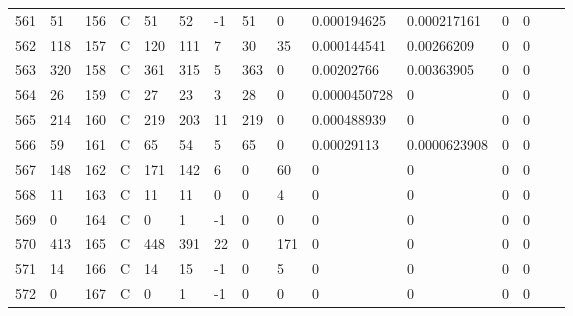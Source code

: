 \begin{longtable}{lllllllllllllll}
	561 & 51                & 156 & C   & 51                & 52                & -1                & 51   & 0          & 0.000194625    & 0.000217161    & 0             & 0            \\
	562 & 118               & 157 & C   & 120               & 111               & 7                 & 30   & 35         & 0.000144541    & 0.00266209     & 0             & 0            \\
	563 & 320               & 158 & C   & 361               & 315               & 5                 & 363  & 0          & 0.00202766     & 0.00363905     & 0             & 0            \\
	564 & 26                & 159 & C   & 27                & 23                & 3                 & 28   & 0          & 0.0000450728   & 0              & 0             & 0            \\
	565 & 214               & 160 & C   & 219               & 203               & 11                & 219  & 0          & 0.000488939    & 0              & 0             & 0            \\
	566 & 59                & 161 & C   & 65                & 54                & 5                 & 65   & 0          & 0.00029113     & 0.0000623908   & 0             & 0            \\
	567 & 148               & 162 & C   & 171               & 142               & 6                 & 0    & 60         & 0              & 0              & 0             & 0            \\
	568 & 11                & 163 & C   & 11                & 11                & 0                 & 0    & 4          & 0              & 0              & 0             & 0            \\
	569 & 0                 & 164 & C   & 0                 & 1                 & -1                & 0    & 0          & 0              & 0              & 0             & 0            \\
	570 & 413               & 165 & C   & 448               & 391               & 22                & 0    & 171        & 0              & 0              & 0             & 0            \\
	571 & 14                & 166 & C   & 14                & 15                & -1                & 0    & 5          & 0              & 0              & 0             & 0            \\
	572 & 0                 & 167 & C   & 0                 & 1                 & -1                & 0    & 0          & 0              & 0              & 0             & 0            \\

\end{longtable}
